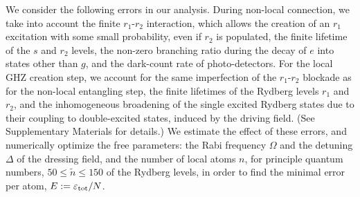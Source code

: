 We consider the following errors in our analysis. During
non-local connection, we take into account the finite $r_1$-$r_2$ interaction, which
allows the creation of an $r_1$ excitation with some small probability, even if
$r_2$ is populated, the finite lifetime of the $s$ and $r_2$ levels, the
non-zero branching ratio during the decay of $e$ into states other than $g$, and
the dark-count rate of photo-detectors. For the local GHZ creation step, we account
for the same imperfection of the
$r_1$-$r_2$ blockade as for the non-local entangling step, the finite lifetimes
of the Rydberg levels $r_1$ and $r_2$, and the inhomogeneous broadening of the
single excited Rydberg states due to their coupling to double-excited states,
induced by the driving field.
(See Supplementary Materials for details.) We estimate the effect of these
errors, and numerically optimize the free parameters: the Rabi frequency
$\Omega$ and the detuning $\Delta$ of the dressing field, and the
number of local atoms $n$, for principle quantum numbers, $50\leq \tilde n \leq
150$ of the Rydberg levels, in order to find the minimal
error per atom, $E := \varepsilon_\mathrm{tot}/N$.
 
